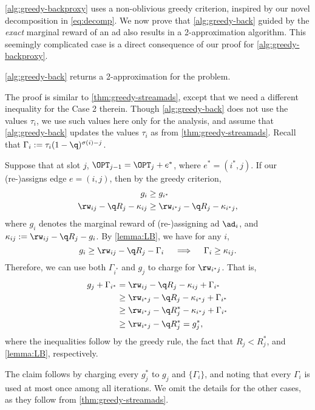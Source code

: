 \cref{alg:greedy-backproxy} uses a non-oblivious greedy criterion,
inspired by our novel decomposition in \cref{eq:decomp}. 
We now prove that %
\cref{alg:greedy-back} guided by the \emph{exact} marginal reward of an ad also results in a 2-approximation algorithm. %
This seemingly complicated case 
is
a direct consequence of our proof for \cref{alg:greedy-backproxy}.

\begin{corollaryE}\label{thm:greedy-streamads-oblivious}
	\cref{alg:greedy-back} returns a 2-approximation for the \streamads problem.
\end{corollaryE}
\begin{proofE}%
	The proof is similar to \cref{thm:greedy-streamads}, 
	except that we need a different inequality for the Case 2 therein.
	Though \cref{alg:greedy-back} does not use the values $\tau_i$, 
	we use such values here only for the analysis, and assume that \cref{alg:greedy-back} updates the values $\tau_i$ as from \cref{thm:greedy-streamads}.
	Recall that $\Gamma_i := \tau_i (1-\q)^{\sigma(i)-j}$.
	
	Suppose that at slot $j$, 
	$\OPT_{j-1} = \OPT_{j} + e^*$, where $e^* = (i^*, j)$.
	If our \ALG (re-)assigns edge $e=(i, j)$, then by the greedy criterion, %
	\begin{align*}
		g_{i} &\ge g_{i^*} \\
		\rw_{ij} -\q R_j - \kappa_{ij} &\ge \rw_{i^*j} -\q R_j - \kappa_{i^*j},
	\end{align*}
	where $g_i$ denotes the marginal reward of (re-)assigning ad $\ad_i$, and
	$\kappa_{ij} := \rw_{ij} -\q R_j - g_{i}$.
	By \cref{lemma:LB}, we have for any $i$,
	\[
		g_i \ge \rw_{ij} -\q R_j - \Gamma_i
		\quad\implies\quad
		\Gamma_i \ge \kappa_{ij}.
	\]
	Therefore, we can use both $\Gamma_{i^*}$ and $g_j$ to charge for $\rw_{i^*j}$. 
	That is,
	\begin{align*}
		g_j + \Gamma_{i^*} 
		&= \rw_{ij} -\q R_j - \kappa_{ij} + \Gamma_{i^*} \\
		&\ge \rw_{i^*j} -\q R_j - \kappa_{i^*j} + \Gamma_{i^*} \\
		&\ge \rw_{i^*j} -\q R_j^* - \kappa_{i^*j} + \Gamma_{i^*} \\
		&\ge \rw_{i^*j} -\q R_j^* = g^*_j,
	\end{align*}
	where the inequalities follow by 
	the greedy rule,
	the fact that $R_j < R_j^*$, and
	\cref{lemma:LB},
	respectively.
	
	The claim follows by 
	charging every $g^*_j$ to $g_j$ and $\{ \Gamma_i \}$, and
	noting that every $\Gamma_i$ is used at most once among all iterations.
	We omit the details for the other cases, as they follow from \cref{thm:greedy-streamads}.
\end{proofE}
